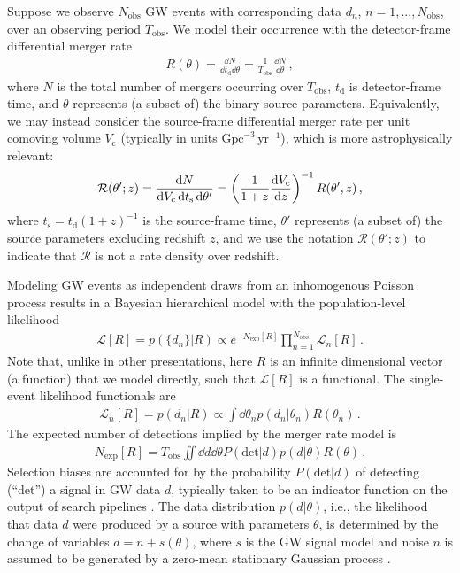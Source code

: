 \documentclass[%
reprint,
 amsmath,amssymb,
 aps,
 prd,nofootinbib,nobibnotes,
 superscriptaddress,groupedaddress,
]{revtex4-2}
\begin{document}
Suppose we observe $N_\mathrm{obs}$ GW events with corresponding data $d_n$, $n=1,...,N_\mathrm{obs}$, over an observing period $T_\mathrm{obs}$. We model their occurrence with the detector-frame differential merger rate
\begin{align}
\label{eq: rate density}
R ( \theta )
=
\frac{ \dd{N} }{ \dd{t_\mathrm{d}} \dd{\theta} }
=
\frac{ 1 }{ T_\mathrm{obs} }
\frac{ \dd{N} }{ \dd{\theta} }
\, ,
\end{align}
where $N$ is the total number of mergers occurring over $T_\mathrm{obs}$, $t_\mathrm{d}$ is detector-frame time, and $\theta$ represents (a subset of) the binary source parameters. Equivalently, we may instead consider the source-frame differential merger rate per unit comoving volume $V_\mathrm{c}$ (typically in units $\mathrm{Gpc}^{-3} \, \mathrm{yr}^{-1}$), which is more astrophysically relevant:
\begin{align}
\label{eq: comoving rate density}
\mathcal{R} ( \theta' ; z )
=
\frac{ \dd{N} }{ \dd{V_\mathrm{c}} \dd{t_\mathrm{s}} \dd{\theta'} }
=
\left( \frac{ 1 }{ 1 + z } \dv {V_\mathrm{c}} {z} \right)^{-1}
R ( \theta' , z )
\, ,
\end{align}
where $t_\mathrm{s} = t_\mathrm{d} (1+z)^{-1}$ is the source-frame time, $\theta'$ represents (a subset of) the source parameters excluding redshift $z$, and we use the notation $\mathcal{R} ( \theta' ; z )$ to indicate that $\mathcal{R}$ is not a rate density over redshift.

Modeling GW events as independent draws from an inhomogenous Poisson process results in a Bayesian hierarchical model with the population-level likelihood \cite{Mandel:2018mve, Thrane:2018qnx, Vitale2020, Essick:2023upv}
\begin{align}
\label{eq: likelihood}
\mathcal{L}[R]
=
p ( \{ d_n \} | R )
\propto
e^{ -N_\mathrm{exp} [ R ] }
\prod_{n=1}^{N_\mathrm{obs}} \mathcal{L}_n[R]
\, .
\end{align}
Note that, unlike in other presentations, here $R$ is an infinite dimensional vector (a function) that we model directly, such that $\mathcal{L} [ R ]$ is a functional.
The single-event likelihood functionals are
\begin{align}
\mathcal{L}_n[R]
=
p ( d_n | R )
\propto
\int \dd{\theta_n} p ( d_n | \theta_n ) R ( \theta_n )
\, .
\label{eq: single event likelihood}
\end{align}
The expected number of detections implied by the merger rate model is
\begin{align}
\label{eq: Nexp}
N_\mathrm{exp} [ R ]
=
T_\mathrm{obs}
\iint \dd{d} \dd{\theta}
P ( \mathrm{det} | d )  p ( d | \theta ) R ( \theta )
\, .
\end{align}
Selection biases are accounted for by the probability  $P(\mathrm{det}|d)$ of detecting (``det'') a signal in GW data $d$, typically taken to be an indicator function on the output of search pipelines \cite{KAGRA:2021duu, Essick:2023upv}. The data distribution $p(d|\theta)$, i.e., the likelihood that data $d$ were produced by a source with parameters $\theta$, is determined by the change of variables $d = n + s(\theta)$, where $s$ is the GW signal model and noise $n$ is assumed to be generated by a zero-mean stationary Gaussian process \cite{Finn:1992wt, Cutler:1994ys}.
\end{document}
